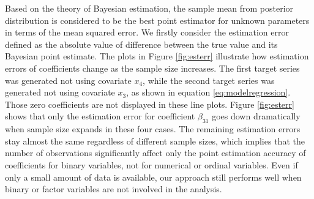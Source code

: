 \documentclass[twoside,11pt]{article}
\begin{document}
Based on the theory of Bayesian estimation, the sample mean from posterior distribution is considered to be the best point estimator for unknown parameters in terms of the mean squared error. We firstly consider the estimation error defined as the absolute value of difference between the true value and its Bayesian point estimate. The plots in Figure \ref{fig:esterr} illustrate how estimation errors of coefficients change as the sample size increases. The first target series was generated not using covariate $x_4$, while the second target series was generated not using covariate $x_3$, as shown in equation \eqref{eq:modelregression}. Those zero coefficients are not displayed in these line plots. Figure \ref{fig:esterr} shows that only the estimation error for coefficient $\beta_{31}$ goes down dramatically when sample size expands in these four cases. The remaining estimation errors stay almost the same regardless of different sample sizes, which implies that the number of observations significantly affect only the point estimation accuracy of coefficients for binary variables, not for numerical or ordinal variables. Even if only a small amount of data is available, our approach still performs well when binary or factor variables are not involved in the analysis. 
\end{document}
